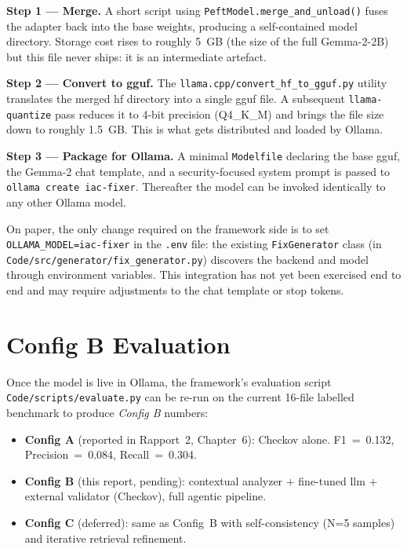 \documentclass[12pt, a4paper]{report}
\begin{document}
\textbf{Step 1 --- Merge.} A short script using
\texttt{PeftModel.merge\_and\_unload()} fuses the adapter back into the
base weights, producing a self-contained model directory. Storage cost
rises to roughly 5~GB (the size of the full Gemma-2-2B) but this file
never ships: it is an intermediate artefact.

\textbf{Step 2 --- Convert to \gls{gguf}.} The
\texttt{llama.cpp/convert\_hf\_to\_gguf.py} utility translates the merged
\gls{hf} directory into a single \gls{gguf} file. A subsequent
\texttt{llama-quantize} pass reduces it to 4-bit precision (Q4\_K\_M)
and brings the file size down to roughly 1.5~GB. This is what gets
distributed and loaded by Ollama.

\textbf{Step 3 --- Package for Ollama.} A minimal \texttt{Modelfile}
declaring the base \gls{gguf}, the Gemma-2 chat template, and a
security-focused system prompt is passed to
\texttt{ollama create iac-fixer}. Thereafter the model can be invoked
identically to any other Ollama model.

On paper, the only change required on the framework side is to set
\texttt{OLLAMA\_MODEL=iac-fixer} in the \texttt{.env} file: the existing
\texttt{FixGenerator} class (in \texttt{Code/src/generator/fix\_generator.py})
discovers the backend and model through environment variables.
This integration has not yet been exercised end to end and may require
adjustments to the chat template or stop tokens.

\section{Config B Evaluation}

Once the model is live in Ollama, the framework's evaluation script
\texttt{Code/scripts/evaluate.py} can be re-run on the current 16-file
labelled benchmark to produce \emph{Config B} numbers:

\begin{itemize}
  \item \textbf{Config A} (reported in Rapport~2, Chapter~6):
        Checkov alone. F1~=~0.132, Precision~=~0.084, Recall~=~0.304.
  \item \textbf{Config B} (this report, pending):
        contextual analyzer $+$ fine-tuned \gls{llm} $+$ external
        validator (Checkov), full agentic pipeline.
  \item \textbf{Config C} (deferred):
        same as Config~B with self-consistency (N=5 samples) and
        iterative retrieval refinement.
\end{itemize}
\end{document}
